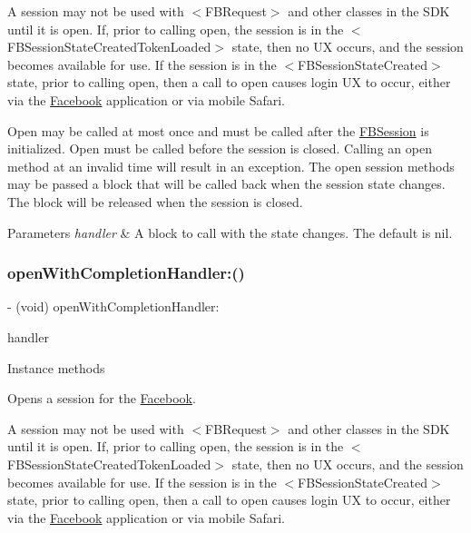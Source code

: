 A session may not be used with $<$\+F\+B\+Request$>$ and other classes in the S\+DK until it is open. If, prior to calling open, the session is in the $<$\+F\+B\+Session\+State\+Created\+Token\+Loaded$>$ state, then no UX occurs, and the session becomes available for use. If the session is in the $<$\+F\+B\+Session\+State\+Created$>$ state, prior to calling open, then a call to open causes login UX to occur, either via the \hyperlink{interfaceFacebook}{Facebook} application or via mobile Safari.

Open may be called at most once and must be called after the {\ttfamily \hyperlink{interfaceFBSession}{F\+B\+Session}} is initialized. Open must be called before the session is closed. Calling an open method at an invalid time will result in an exception. The open session methods may be passed a block that will be called back when the session state changes. The block will be released when the session is closed.


\begin{DoxyParams}{Parameters}
{\em handler} & A block to call with the state changes. The default is nil. \\
\hline
\end{DoxyParams}
\mbox{\label{interfaceFBSession_a874152230789c87cd181d1f976e3715f}} 
\subsubsection{\texorpdfstring{open\+With\+Completion\+Handler\+:()}{openWithCompletionHandler:()}\hspace{0.1cm}{\footnotesize\ttfamily [3/5]}}
{\footnotesize\ttfamily -\/ (void) open\+With\+Completion\+Handler\+: \begin{DoxyParamCaption}\item[{(F\+B\+Session\+State\+Handler)}]{handler }\end{DoxyParamCaption}}

Instance methods

Opens a session for the \hyperlink{interfaceFacebook}{Facebook}.

A session may not be used with $<$\+F\+B\+Request$>$ and other classes in the S\+DK until it is open. If, prior to calling open, the session is in the $<$\+F\+B\+Session\+State\+Created\+Token\+Loaded$>$ state, then no UX occurs, and the session becomes available for use. If the session is in the $<$\+F\+B\+Session\+State\+Created$>$ state, prior to calling open, then a call to open causes login UX to occur, either via the \hyperlink{interfaceFacebook}{Facebook} application or via mobile Safari.

